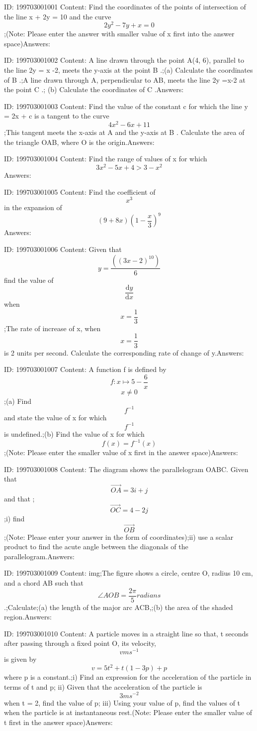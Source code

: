 \documentclass{article}
\begin{document}
ID: 199703001001
Content:
Find the coordinates of the points of intersection of the line x + 2y = 10 and the curve \[2y^2-7y+x=0\];(Note: Please enter the answer with smaller value of x first into the answer space)Answers:

ID: 199703001002
Content:
A line drawn through the point A(4, 6), parallel to the line 2y = x -2, meets the y-axis at the point B .;(a)	Calculate the coordinates of B .;A line drawn through A, perpendicular to AB, meets the line 2y =x-2 at the point C .; (b)	Calculate the coordinates of C .Answers:

ID: 199703001003
Content:
Find the value of the constant c for which the line y = 2x + c is a tangent to the curve \[4x^2-6x+11\];This tangent meets the x-axis at A and the y-axis at B . Calculate the area of the triangle OAB, where O is the origin.Answers:

ID: 199703001004
Content:
Find the range of values of x for which \[3x^2-5x+4>3-x^2\]Answers:

ID: 199703001005
Content:
Find the coefficient of  \[x^{3}\]  in the expansion of \[(9+8x)(1-\frac{x}{3})^9\]Answers:

ID: 199703001006
Content:
Given that \[y=\frac{((3x-2)^{10})}{6}\]  find the value of  \[\frac{\mathrm{d} y}{\mathrm{d} x}\]when \[x=\frac{1}{3}\];The rate of increase of x, when \[x=\frac{1}{3}\]is 2 units per second. Calculate the corresponding rate of change of y.Answers:

ID: 199703001007
Content:
A function f is defined by \[f:x \mapsto  5-\frac{6}{x}\] \[x\neq 0\];(a) Find \[f^{-1}\] and state the value of x for which \[f^{-1}\]  is undefined.;(b)	Find the value of x for which \[f(x)=f^{-1}(x)\];(Note: Please enter the smaller value of x first in the answer space)Answers:

ID: 199703001008
Content:
The diagram shows the parallelogram OABC. Given that \[\vec{OA}=3i+j\] and that ; \[\vec{OC}=4-2j\];i) find \[\vec{OB}\];(Note: Please enter your answer in the form of coordinates);ii) use a scalar product to find the acute angle between the diagonals of the parallelogram.Answers:

ID: 199703001009
Content:
img;The figure shows a circle, centre O, radius 10 cm, and a chord AB such that \[\angle AOB = \frac{2\pi }{5}radians\].;Calculate;(a)	the length of the major arc ACB,;(b)	the area of the shaded region.Answers:

ID: 199703001010
Content:
A particle moves in a straight line so that, t seconds after passing through a fixed point O, its velocity, \[vms^{-1}\] is given by \[v=5t^2+t(1-3p)+p\] where p is a constant.;i) Find an expression for the acceleration of the particle in terms of t and p; ii) Given that the acceleration of the particle is \[3ms^{-2}\]when t = 2, find the value of p; iii) Using your value of p, find the values of t when the particle is at instantaneous rest.(Note: Please enter the smaller value of t first in the answer space)Answers:
\end{document}
